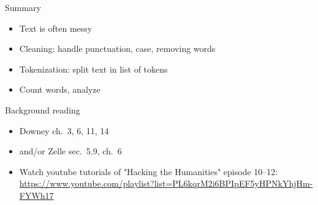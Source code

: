 \documentclass[aspectratio=169,usenames,dvipsnames]{beamer}
\begin{document}
\begin{frame}{Summary}
    \begin{itemize}
        \item Text is often messy
        \item Cleaning: handle punctuation, case, removing words
        \item Tokenization: split text in list of tokens
        \item Count words, analyze
    \end{itemize}
\end{frame}

\begin{frame}{Background reading}
    \begin{itemize}
        \item Downey ch.\ 3, 6, 11, 14
        \item and/or Zelle sec.\ 5.9, ch.\ 6
        \item Watch youtube tutorials of "Hacking the Humanities" episode 10--12:
            {\small \url{https://www.youtube.com/playlist?list=PL6kqrM2i6BPIpEF5yHPNkYhjHm-FYWh17}}
    \end{itemize}
\end{frame}
\end{document}

